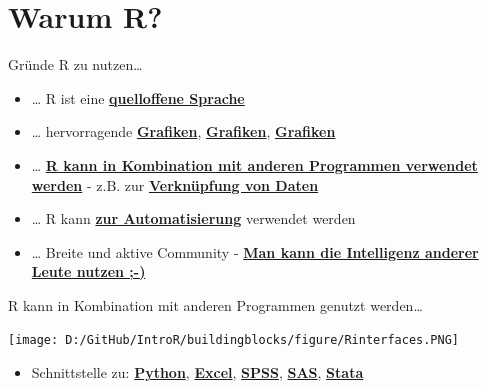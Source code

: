 \documentclass[ignorenonframetext,]{beamer}
\providecommand{\tightlist}{%
  \setlength{\itemsep}{0pt}\setlength{\parskip}{0pt}}
\begin{document}
\hypertarget{warum-r}{%
\section{Warum R?}\label{warum-r}}

\begin{frame}{Gründe R zu nutzen\ldots{}}
\protect\hypertarget{grunde-r-zu-nutzen}{}

\begin{itemize}
\item
  \ldots{} R ist eine
  \href{https://stackoverflow.com/questions/1546583/what-is-the-definition-of-an-open-source-programming-language}{\textbf{quelloffene
  Sprache}}
\item
  \ldots{} hervorragende
  \href{http://matthewlincoln.net/2014/12/20/adjacency-matrix-plots-with-r-and-ggplot2.html}{\textbf{Grafiken}},
  \href{https://www.r-bloggers.com/3d-plots-with-ggplot2-and-plotly\%20/}{\textbf{Grafiken}},
  \href{https://procomun.wordpress.com/2011/03/18/splomr/}{\textbf{Grafiken}}
\item
  \ldots{} \href{https://github.com/Japhilko/RInterfaces}{\textbf{R kann
  in Kombination mit anderen Programmen verwendet werden}} - z.B. zur
  \href{https://github.com/Japhilko/RInterfaces/blob/master/slides/Datenimport.md}{\textbf{Verknüpfung
  von Daten}}
\item
  \ldots{} R kann
  \href{https://cran.r-project.org/web/packages/MplusAutomation/index.html}{\textbf{zur
  Automatisierung}} verwendet werden
\item
  \ldots{} Breite und aktive Community -
  \href{https://www.r-bloggers.com/}{\textbf{Man kann die Intelligenz
  anderer Leute nutzen ;-)}}
\end{itemize}

\end{frame}

\begin{frame}{R kann in Kombination mit anderen Programmen genutzt
werden\ldots{}}
\protect\hypertarget{r-kann-in-kombination-mit-anderen-programmen-genutzt-werden}{}

\texttt{[image: D:/GitHub/IntroR/buildingblocks/figure/Rinterfaces.PNG]}

\begin{itemize}
\tightlist
\item
  Schnittstelle zu:
  \href{https://cran.r-project.org/web/packages/reticulate/vignettes/calling_python.html}{\textbf{Python}},
  \href{https://www.springer.com/de/book/9781441900517}{\textbf{Excel}},
  \href{https://www.ibm.com/support/knowledgecenter/en/SSFUEU_7.2.0/com.ibm.swg.ba.cognos.op_capmod_ig.7.2.0.doc/t_essentials_for_r_statistics.html}{\textbf{SPSS}},
  \href{https://cran.r-project.org/web/packages/SASmixed/index.html}{\textbf{SAS}},
  \href{https://cran.r-project.org/web/packages/RStata/index.html}{\textbf{Stata}}
\end{itemize}

\end{frame}
\end{document}
